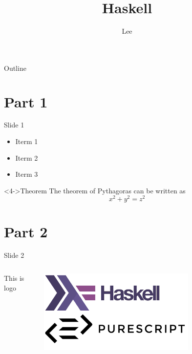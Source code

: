 \documentclass{beamer}
\title{Haskell}
\author{Lee}
\begin{document}
\begin{frame}
  \maketitle
\end{frame}

\begin{frame}{Outline}
  \tableofcontents
\end{frame}

\section{Part 1}

\begin{frame}[t]{Slide 1}
  \begin{itemize}
  \item<1-> Iterm 1
  \item<2-> Iterm 2
  \item<3-> Iterm 3
  \end{itemize}
  \begin{block}<4->{Theorem}
    The theorem of Pythagoras can be written as
  $$ x^2 + y^2 = z^2$$
  \end{block}
\end{frame}

\section{Part 2}
\begin{frame}{Slide 2}
  \begin{columns}
    \begin{column}{0.5\textwidth}
      This is logo
    \end{column}
    \begin{column}{0.5\textwidth}
  \begin{center}
    \includegraphics[width=0.7\textwidth]{haskell.png}
  \end{center}
    \end{column}
  \end{columns}
\end{frame}
\end{document}
